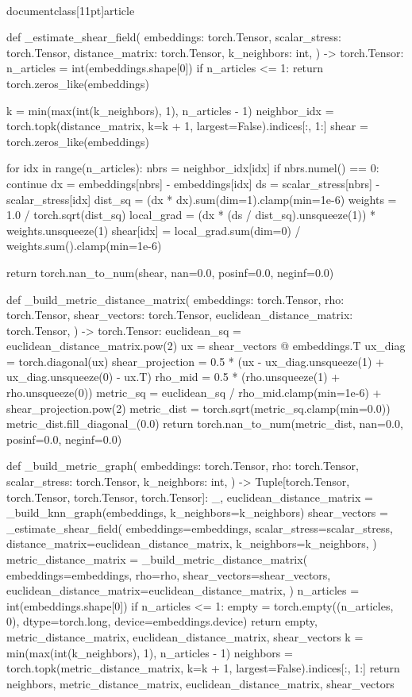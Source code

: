 \\documentclass[11pt]{article}
\begin{document}
\begin{CodeBlock}
def _estimate_shear_field(
    embeddings: torch.Tensor,
    scalar_stress: torch.Tensor,
    distance_matrix: torch.Tensor,
    k_neighbors: int,
) -> torch.Tensor:
    n_articles = int(embeddings.shape[0])
    if n_articles <= 1:
        return torch.zeros_like(embeddings)

    k = min(max(int(k_neighbors), 1), n_articles - 1)
    neighbor_idx = torch.topk(distance_matrix, k=k + 1, largest=False).indices[:, 1:]
    shear = torch.zeros_like(embeddings)

    for idx in range(n_articles):
        nbrs = neighbor_idx[idx]
        if nbrs.numel() == 0:
            continue
        dx = embeddings[nbrs] - embeddings[idx]
        ds = scalar_stress[nbrs] - scalar_stress[idx]
        dist_sq = (dx * dx).sum(dim=1).clamp(min=1e-6)
        weights = 1.0 / torch.sqrt(dist_sq)
        local_grad = (dx * (ds / dist_sq).unsqueeze(1)) * weights.unsqueeze(1)
        shear[idx] = local_grad.sum(dim=0) / weights.sum().clamp(min=1e-6)

    return torch.nan_to_num(shear, nan=0.0, posinf=0.0, neginf=0.0)


def _build_metric_distance_matrix(
    embeddings: torch.Tensor,
    rho: torch.Tensor,
    shear_vectors: torch.Tensor,
    euclidean_distance_matrix: torch.Tensor,
) -> torch.Tensor:
    euclidean_sq = euclidean_distance_matrix.pow(2)
    ux = shear_vectors @ embeddings.T
    ux_diag = torch.diagonal(ux)
    shear_projection = 0.5 * (ux - ux_diag.unsqueeze(1) + ux_diag.unsqueeze(0) - ux.T)
    rho_mid = 0.5 * (rho.unsqueeze(1) + rho.unsqueeze(0))
    metric_sq = euclidean_sq / rho_mid.clamp(min=1e-6) + shear_projection.pow(2)
    metric_dist = torch.sqrt(metric_sq.clamp(min=0.0))
    metric_dist.fill_diagonal_(0.0)
    return torch.nan_to_num(metric_dist, nan=0.0, posinf=0.0, neginf=0.0)


def _build_metric_graph(
    embeddings: torch.Tensor,
    rho: torch.Tensor,
    scalar_stress: torch.Tensor,
    k_neighbors: int,
) -> Tuple[torch.Tensor, torch.Tensor, torch.Tensor, torch.Tensor]:
    _, euclidean_distance_matrix = _build_knn_graph(embeddings, k_neighbors=k_neighbors)
    shear_vectors = _estimate_shear_field(
        embeddings=embeddings,
        scalar_stress=scalar_stress,
        distance_matrix=euclidean_distance_matrix,
        k_neighbors=k_neighbors,
    )
    metric_distance_matrix = _build_metric_distance_matrix(
        embeddings=embeddings,
        rho=rho,
        shear_vectors=shear_vectors,
        euclidean_distance_matrix=euclidean_distance_matrix,
    )
    n_articles = int(embeddings.shape[0])
    if n_articles <= 1:
        empty = torch.empty((n_articles, 0), dtype=torch.long, device=embeddings.device)
        return empty, metric_distance_matrix, euclidean_distance_matrix, shear_vectors
    k = min(max(int(k_neighbors), 1), n_articles - 1)
    neighbors = torch.topk(metric_distance_matrix, k=k + 1, largest=False).indices[:, 1:]
    return neighbors, metric_distance_matrix, euclidean_distance_matrix, shear_vectors



\end{CodeBlock}
\end{document}
